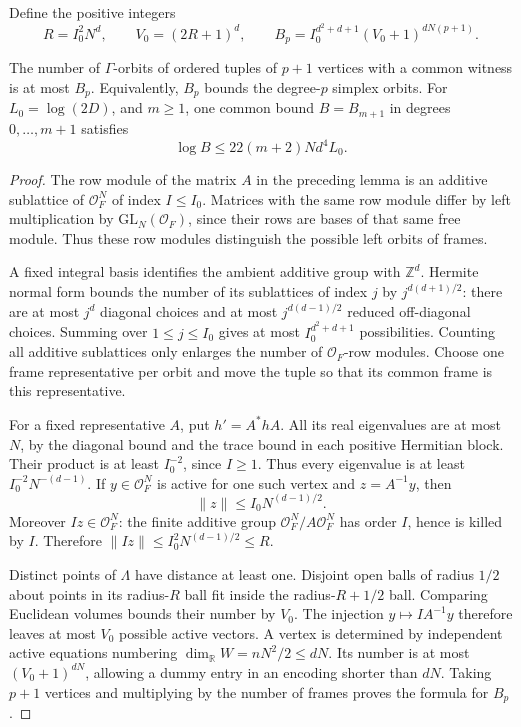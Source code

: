 Define the positive integers
\[
 R=I_0^2N^d,\qquad V_0=(2R+1)^d,\qquad
 B_p=I_0^{d^2+d+1}(V_0+1)^{dN(p+1)}.
\]
\begin{srproposition}\label{prop:sr-orbit-bound}
The number of \(\Gamma\)-orbits of ordered tuples of \(p+1\) vertices
with a common witness is at most \(B_p\).
Equivalently, \(B_p\) bounds the degree-\(p\) simplex orbits.
For \(L_0=\log(2D)\), and \(m\geq1\), one common bound
\(B=B_{m+1}\) in degrees \(0,\ldots,m+1\) satisfies
\begin{equation}\label{eq:sr-orbit-log}
                   \log B\leq22(m+2)N d^4L_0 .
\end{equation}
\end{srproposition}
\begin{proof}
The row module of the matrix \(A\) in the preceding lemma is an
additive sublattice of \(\mathcal O_F^N\) of index \(I\leq I_0\).
Matrices with the same row module differ by left multiplication by
\(\mathrm{GL}_N(\mathcal O_F)\), since their rows are bases of that
same free module.
Thus these row modules distinguish the possible left orbits of frames.

A fixed integral basis identifies the ambient additive group with
\(\mathbb Z^d\). Hermite normal form bounds the number of its
sublattices of index \(j\) by \(j^{d(d+1)/2}\):
there are at most \(j^d\) diagonal choices and at most
\(j^{d(d-1)/2}\) reduced off-diagonal choices.
Summing over \(1\leq j\leq I_0\) gives at most
\(I_0^{d^2+d+1}\) possibilities.
Counting all additive sublattices only enlarges the number of
\(\mathcal O_F\)-row modules.
Choose one frame representative per orbit and move the tuple so
that its common frame is this representative.

For a fixed representative \(A\), put \(h'=A^*hA\).
All its real eigenvalues are at most \(N\), by the diagonal bound
and the trace bound in each positive Hermitian block.
Their product is at least \(I_0^{-2}\), since \(I\geq1\).
Thus every eigenvalue is at least \(I_0^{-2}N^{-(d-1)}\).
If \(y\in\mathcal O_F^N\) is active for one such vertex and
\(z=A^{-1}y\), then
\[
                    \|z\|\leq I_0N^{(d-1)/2}.
\]
Moreover \(Iz\in\mathcal O_F^N\): the finite additive group
\(\mathcal O_F^N/A\mathcal O_F^N\) has order \(I\), hence is killed
by \(I\). Therefore
\(\|Iz\|\leq I_0^2N^{(d-1)/2}\leq R\).

Distinct points of \(\Lambda\) have distance at least one.
Disjoint open balls of radius \(1/2\) about points in its radius-\(R\)
ball fit inside the radius-\(R+1/2\) ball. Comparing Euclidean volumes
bounds their number by \(V_0\).
The injection \(y\mapsto IA^{-1}y\) therefore leaves at most \(V_0\)
possible active vectors.
A vertex is determined by independent active equations numbering
\(\dim_{\mathbb R}W=nN^2/2\leq dN\).
Its number is at most \((V_0+1)^{dN}\), allowing a dummy entry in
an encoding shorter than \(dN\).
Taking \(p+1\) vertices and multiplying by the number of frames proves
the formula for \(B_p\).


\end{proof}
